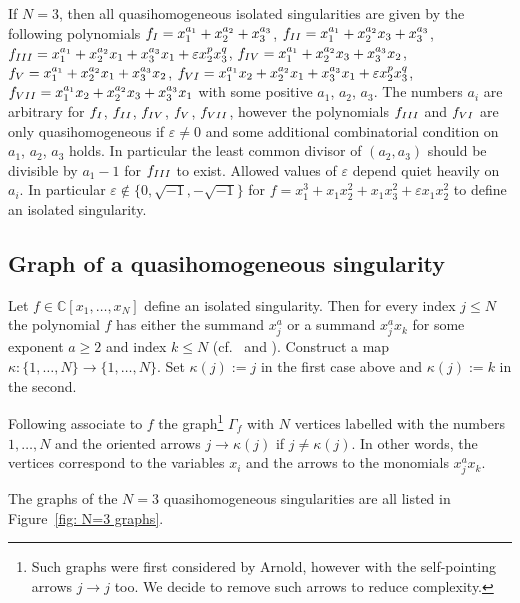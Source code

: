 \documentclass[10pt,a4paper]{article}
\numberwithin{equation}{section}
\newcommand{\CC}{{\mathbb{C}}}
\newcommand{\eps}{\varepsilon}
\begin{document}
\begin{Example}\label{ex: N=3 quasihomogeneous}
If $N = 3$, then all quasihomogeneous isolated singularities are given by the following polynomials $f_{\rm I} = x_1^{a_1} + x_2^{a_2}+ x_3^{a_3}$, $f_{\rm II} = x_1^{a_1} + x_2^{a_2}x_3 + x_3^{a_3}$, $f_{\rm III} = x_1^{a_1} + x_2^{a_2}x_1+ x_3^{a_3}x_1 + \eps x_2^{p}x_3^q$, $f_{\rm IV} = x_1^{a_1} + x_2^{a_2}x_3 + x_3^{a_3}x_2$,
	$f_{\rm V} = x_1^{a_1} + x_2^{a_2}x_1 + x_3^{a_3}x_2$, $f_{\rm VI} = x_1^{a_1}x_2 + x_2^{a_2}x_1 + x_3^{a_3}x_1 + \eps x_2^p x_3^q$, $f_{\rm VII} = x_1^{a_1}x_2 + x_2^{a_2}x_3 + x_3^{a_3}x_1$ with some positive $a_1$, $a_2$, $a_3$. The numbers $a_i$ are arbitrary for $f_{\rm I}$, $f_{\rm II}$, $f_{\rm IV}$, $f_{\rm V}$, $f_{\rm VII}$, however the polynomials $f_{\rm III}$ and $f_{\rm VI}$ are only quasihomogeneous if $\eps \neq 0$ and some additional combinatorial condition on $a_1$, $a_2$, $a_3$ holds. In particular the least common divisor of $(a_2,a_3)$ should be divisible by $a_1-1$ for $f_{\rm III}$ to exist. Allowed values of $\eps$ depend quiet heavily on $a_i$. In particular $\eps \not\in\lbrace 0,\sqrt{-1},-\sqrt{-1}\rbrace $ for $f = x_1^3 + x_1x_2^2 + x_1x_3^2 + \eps x_1x_2^2$ to define an isolated singularity.
\end{Example}

\subsection{Graph of a quasihomogeneous singularity}
Let $f \in \CC[x_1,\dots,x_N]$ define an isolated singularity. Then for every index $j \le N$ the polynomial $f$ has either the summand $x_j^{a}$ or a summand $x_j^ax_k$ for some exponent $a \ge 2$ and index $k \le N$ (cf.\ \cite[Korollar~1.6]{S71} and \cite[Theorem~2.2]{HK}). Construct a map $\kappa\colon \lbrace 1,\dots,N\rbrace \to \lbrace 1,\dots,N\rbrace$. Set $\kappa(j):=j$ in the first case above and $\kappa(j) := k$ in the second.

Following \cite[Section 3]{HK} associate to $f$ the graph\footnote{Such graphs were first considered by Arnold, however with the self-pointing arrows $j \to j$ too. We decide to remove such arrows to reduce complexity.}
$\Gamma_f$ with $N$ vertices labelled with the numbers $1,\dots,N$ and the oriented arrows $j \to \kappa(j)$ if $j \neq \kappa(j)$. In other words, the vertices correspond to the variables $x_i$ and the arrows to the monomials $x_j^ax_k$.

\begin{Example}
The graphs of the $N=3$ quasihomogeneous singularities are all listed in Figure~\ref{fig: N=3 graphs}.
\end{Example}
\end{document}
